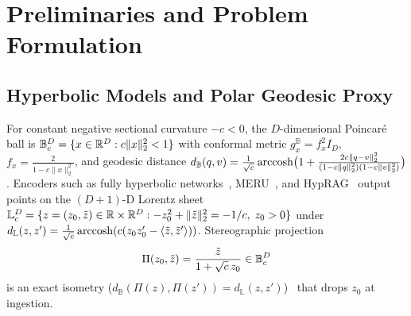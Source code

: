 \section{Preliminaries and Problem Formulation}
\label{sec:prelim}

\subsection{Hyperbolic Models and Polar Geodesic Proxy}
\label{subsec:models}

For constant negative sectional curvature $-c < 0$, the $D$-dimensional {Poincar\'e} ball is $\mathbb{B}_c^D = \{x \in \mathbb{R}^D : c\|x\|_2^2 < 1\}$ with conformal metric $g_x^{\mathbb{B}} = f_x^2 I_D$, $f_x = \frac{2}{1 - c\|x\|_2^2}$, and geodesic distance $d_{\mathbb{B}}(q, v) = \frac{1}{\sqrt{c}}\operatorname{arccosh}\bigl(1 + \frac{2c\|q - v\|_2^2}{(1 - c\|q\|_2^2)(1 - c\|v\|_2^2)}\bigr)$.
Encoders such as fully hyperbolic networks~\cite{chen2022fully}, {MERU}~\cite{desai2023meru}, and {HypRAG}~\cite{madhu2026hyprag} output points on the $(D+1)$-D {Lorentz} sheet $\mathbb{L}_c^D = \{z = (z_0, \tilde{z}) \in \mathbb{R} \times \mathbb{R}^D : -z_0^2 + \|\tilde{z}\|_2^2 = -1/c,\; z_0 > 0\}$ under $d_{\mathbb{L}}(z, z') = \frac{1}{\sqrt{c}}\operatorname{arccosh}(c(z_0 z'_0 - \langle \tilde{z}, \tilde{z}'\rangle))$.
Stereographic projection
\begin{equation}
  \Pi(z_0, \tilde{z}) = \frac{\tilde{z}}{1 + \sqrt{c}\,z_0} \in \mathbb{B}_c^D
  \label{eq:lorentz_isometry}
\end{equation}
is an exact isometry ($d_{\mathbb{B}}(\Pi(z), \Pi(z')) = d_{\mathbb{L}}(z, z')$)~\cite{nickel2018lorentz} that drops $z_0$ at ingestion.

